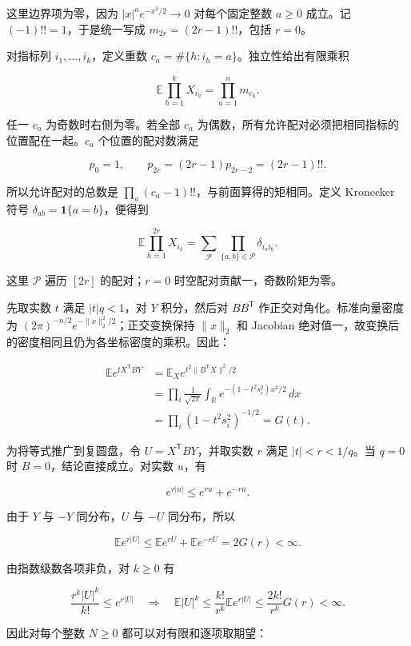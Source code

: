 \documentclass[11pt,a4paper]{article}
\begin{document}
这里边界项为零，因为 \(|x|^ae^{-x^2/2}\to0\) 对每个固定整数 \(a\ge0\) 成立。记 \((-1)!!=1\)，于是统一写成 \(m_{2r}=(2r-1)!!\)，包括 \(r=0\)。

对指标列 \(i_1,\ldots,i_k\)，定义重数 \(c_a=\#\{h:i_h=a\}\)。独立性给出有限乘积

\[
\mathbb E\prod_{h=1}^kX_{i_h}=\prod_{a=1}^n m_{c_a}.
\]

任一 \(c_a\) 为奇数时右侧为零。若全部 \(c_a\) 为偶数，所有允许配对必须把相同指标的位置配在一起。\(c_a\) 个位置的配对数满足

\[
p_0=1,\qquad p_{2r}=(2r-1)p_{2r-2}
=(2r-1)!!.
\]

所以允许配对的总数是 \(\prod_a(c_a-1)!!\)，与前面算得的矩相同。定义 Kronecker 符号 \(\delta_{ab}=\mathbf1\{a=b\}\)，便得到

\[
\mathbb E\prod_{h=1}^{2r}X_{i_h}
=\sum_{\mathcal P}\prod_{\{a,b\}\in\mathcal P}\delta_{i_ai_b}.
\]

这里 \(\mathcal P\) 遍历 \([2r]\) 的配对；\(r=0\) 时空配对贡献一，奇数阶矩为零。

先取实数 \(t\) 满足 \(|t|q<1\)，对 \(Y\) 积分，然后对 \(BB^{\mathsf T}\) 作正交对角化。标准向量密度为 \((2\pi)^{-n/2}e^{-\|x\|_2^2/2}\)；正交变换保持 \(\|x\|_2\) 和 Jacobian 绝对值一，故变换后的密度相同且仍为各坐标密度的乘积。因此：

\[
\begin{aligned}
\mathbb Ee^{tX^{\mathsf T}BY}
&=\mathbb E_Xe^{t^2\|B^{\mathsf T}X\|^2/2}\\
&=\prod_i\frac1{\sqrt{2\pi}}\int_{\mathbb R}
e^{-(1-t^2s_i^2)x^2/2}\,dx\\
&=\prod_i(1-t^2s_i^2)^{-1/2}=G(t).
\end{aligned}
\]

为将等式推广到复圆盘，令 \(U=X^{\mathsf T}BY\)，并取实数 \(r\) 满足 \(|t|<r<1/q\)。当 \(q=0\) 时 \(B=0\)，结论直接成立。对实数 \(u\)，有

\[
e^{r|u|}\le e^{ru}+e^{-ru}.
\]

由于 \(Y\) 与 \(-Y\) 同分布，\(U\) 与 \(-U\) 同分布，所以

\[
\mathbb E e^{r|U|}
\le\mathbb E e^{rU}+\mathbb E e^{-rU}
=2G(r)<\infty.
\]

由指数级数各项非负，对 \(k\ge0\) 有

\[
\frac{r^k|U|^k}{k!}\le e^{r|U|}
\quad\Longrightarrow\quad
\mathbb E|U|^k\le\frac{k!}{r^k}\mathbb Ee^{r|U|}
\le\frac{2k!}{r^k}G(r)<\infty.
\]

因此对每个整数 \(N\ge0\) 都可以对有限和逐项取期望：
\end{document}
